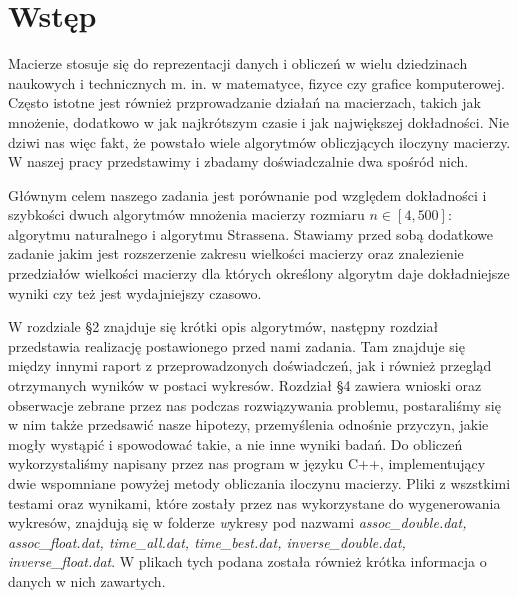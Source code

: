 \section{Wstęp}
Macierze stosuje się do reprezentacji danych i obliczeń w wielu dziedzinach
naukowych i technicznych m. in. w matematyce, fizyce czy grafice komputerowej.
Często istotne jest również przprowadzanie działań na macierzach, takich jak
mnożenie, dodatkowo w jak najkrótszym czasie i jak największej dokładności. Nie dziwi nas więc fakt, że
powstało wiele algorytmów obliczjących iloczyny macierzy. W naszej pracy
przedstawimy i zbadamy doświadczalnie dwa spośród nich.

Głównym celem naszego zadania jest porównanie pod względem dokładności i
szybkości dwuch algorytmów mnożenia macierzy rozmiaru $n \in [4, 500]$:
algorytmu naturalnego i algorytmu Strassena. Stawiamy przed sobą dodatkowe
zadanie jakim jest rozszerzenie zakresu wielkości macierzy oraz znalezienie
przedziałów wielkości macierzy dla których określony algorytm daje
dokładniejsze wyniki czy też jest wydajniejszy czasowo.

W rozdziale \S2 znajduje się krótki opis algorytmów, następny rozdział przedstawia realizację postawionego przed nami zadania. Tam znajduje się między innymi raport
z przeprowadzonych doświadczeń, jak i również przegląd otrzymanych wyników w
postaci wykresów. Rozdział \S 4 zawiera wnioski oraz obserwacje zebrane przez nas podczas rozwiązywania problemu, postaraliśmy się w nim także przedsawić nasze hipotezy, przemyślenia odnośnie przyczyn, jakie mogły wystąpić i spowodować takie, a nie inne wyniki badań.
Do obliczeń wykorzystaliśmy napisany przez nas program w języku C++, implementujący
dwie wspomniane powyżej metody obliczania iloczynu macierzy. Pliki z wszstkimi testami
oraz wynikami, które zostały przez nas wykorzystane do wygenerowania wykresów, znajdują
się w folderze {\textit wykresy} pod nazwami \textit{assoc\_double.dat, assoc\_float.dat, time\_all.dat,
time\_best.dat, inverse\_double.dat, inverse\_float.dat}.
W plikach tych podana została również krótka informacja o danych w nich zawartych.
